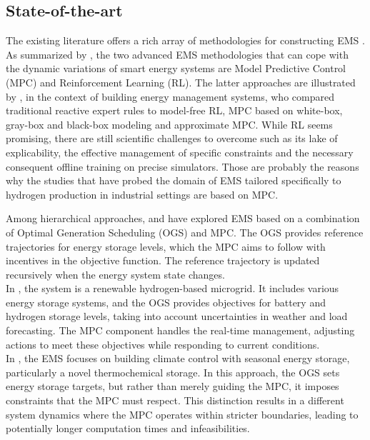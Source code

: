 \subsection{State-of-the-art}

\begin{frame}
The existing literature offers a rich array of methodologies for constructing EMS \cite{weitzel_energy_2018}. As summarized by \cite{alabi_strategic_2023}, the two advanced EMS methodologies that can cope with the dynamic variations of smart energy systems are Model Predictive Control (MPC) and Reinforcement Learning (RL). The latter approaches are illustrated by \cite{stoffel_evaluation_2023}, in the context of building energy management systems, who compared traditional reactive expert rules to model-free RL, MPC based on white-box, gray-box and black-box modeling and approximate MPC. While RL seems promising, there are still scientific challenges to overcome such as its lake of explicability, the effective management of specific constraints and the necessary consequent offline training on precise simulators. Those are probably the reasons why the studies that have probed the domain of EMS tailored specifically to hydrogen production in industrial settings are based on MPC.
\\
\end{frame}

\begin{frame}
Among hierarchical approaches, \cite{petrollese_real-time_2016} and \cite{weber_model_2022} have explored EMS based on a combination of Optimal Generation Scheduling (OGS) and MPC. The OGS provides reference trajectories for energy storage levels, which the MPC aims to follow with incentives in the objective function. The reference trajectory is updated recursively when the energy system state changes.
\\
In \cite{petrollese_real-time_2016}, the system is a renewable hydrogen-based microgrid. It includes various energy storage systems, and the OGS provides objectives for battery and hydrogen storage levels, taking into account uncertainties in weather and load forecasting. The MPC component handles the real-time management, adjusting actions to meet these objectives while responding to current conditions.
\\
In \cite{weber_model_2022}, the EMS focuses on building climate control with seasonal energy storage, particularly a novel thermochemical storage. In this approach, the OGS sets energy storage targets, but rather than merely guiding the MPC, it imposes constraints that the MPC must respect. This distinction results in a different system dynamics where the MPC operates within stricter boundaries, leading to potentially longer computation times and infeasibilities.
\end{frame}

